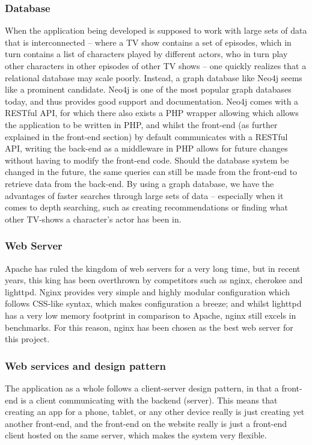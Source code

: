 \subsubsection{Database}
When the application being developed is supposed to work with large sets of data that is interconnected -- where a TV show contains a set of episodes, which in turn contains a list of characters played by different actors, who in turn play other characters in other episodes of other TV shows -- one quickly realizes that a relational database may scale poorly.
Instead, a graph database like Neo4j seems like a prominent candidate. Neo4j is one of the most popular graph databases today, and thus provides good support and documentation. Neo4j comes with a RESTful API, for which there also exists a PHP wrapper allowing which allows the application to be written in PHP, and whilst the front-end (as further explained in the front-end section) by default communicates with a RESTful API, writing the back-end as a middleware in PHP allows for future changes without having to modify the front-end code. Should the database system be changed in the future, the same queries can still be made from the front-end to retrieve data from the back-end.
By using a graph database, we have the advantages of faster searches through large sets of data -- especially when it comes to depth searching, such as creating recommendations or finding what other TV-shows a character's actor has been in. 

\subsubsection{Web Server}
Apache has ruled the kingdom of web servers for a very long time, but in recent years, this king has been overthrown by competitors such as nginx, cherokee and lighttpd. Nginx provides very simple and highly modular configuration which follows CSS-like syntax, which makes configuration a breeze; and whilst lighttpd has a very low memory footprint in comparison to Apache, nginx still excels in benchmarks. For this reason, nginx has been chosen as the best web server for this project.

\subsubsection{Web services and design pattern}
The application as a whole follows a client-server design pattern, in that a front-end is a client communicating with the backend (server). This means that creating an app for a phone, tablet, or any other device really is just creating yet another front-end, and the front-end on the website really is just a front-end client hosted on the same server, which makes the system very flexible.

